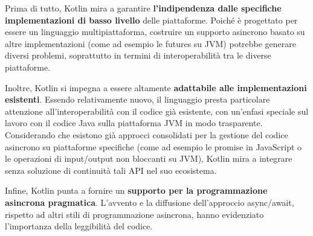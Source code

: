\documentclass[12pt,a4paper,openright,twoside]{book}
\begin{document}
Prima di tutto, Kotlin mira a garantire \textbf{l'indipendenza dalle specifiche implementazioni di basso livello} delle piattaforme. Poiché è progettato per essere un linguaggio multipiattaforma, costruire un supporto asincrono basato su altre implementazioni (come ad esempio le futures su JVM) potrebbe generare diversi problemi, soprattutto in termini di interoperabilità tra le diverse piattaforme.

Inoltre, Kotlin si impegna a essere altamente \textbf{adattabile alle implementazioni esistenti}. Essendo relativamente nuovo, il linguaggio presta particolare attenzione all'interoperabilità con il codice già esistente, con un'enfasi speciale sul lavoro con il codice Java sulla piattaforma JVM in modo trasparente. Considerando che esistono già approcci consolidati per la gestione del codice asincrono su piattaforme specifiche (come ad esempio le promise in JavaScript o le operazioni di input/output non bloccanti su JVM), Kotlin mira a integrare senza soluzione di continuità tali API nel suo ecosistema.

Infine, Kotlin punta a fornire un \textbf{supporto per la programmazione asincrona pragmatica}. L'avvento e la diffusione dell'approccio async/await, rispetto ad altri stili di programmazione asincrona, hanno evidenziato l'importanza della leggibilità del codice.
\end{document}
